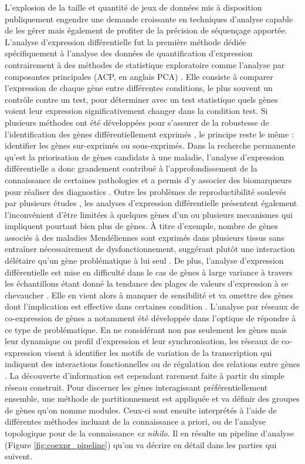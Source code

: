 L'explosion de la taille et quantité de jeux de données mis à disposition publiquement engendre une demande croissante en techniques d'analyse capable de les gérer mais également de profiter de la précision de séquençage apportée. L'analyse d'expression différentielle fut la première méthode dédiée spécifiquement à l'analyse des données de quantification d'expression contrairement à des méthodes de statistique exploratoire comme l'analyse par composantes principales (ACP, en anglais \acrshort{PCA}) \cite{deKok2005Jan}. Elle consiste à comparer l'expression de chaque gène entre différentes \glspl{condition}, le plus souvent un contrôle contre un test, pour déterminer avec un test statistique quels gènes voient leur expression significativement changer dans la condition test. Si plusieurs méthodes ont été développées pour s'assurer de la robustesse de l'identification des gènes différentiellement exprimés \cite{Soneson2013Dec,Spies2019Jan}, le principe reste le même : identifier les gènes sur-exprimés ou sous-exprimés. Dans la recherche permanente qu'est la priorisation de gènes candidats à une maladie, l'analyse d'expression différentielle a donc grandement contribué à l'approfondissement de la connaissance de certaines pathologies et a permis d'y associer des biomarqueurs pour réaliser des diagnostics \cite{Costa-Silva2017Dec}. Outre les problèmes de reproductibilité soulevés par plusieurs études \cite{Ostlund2014}, les analyses d'expression différentielle présentent 
également l'inconvénient d'être limitées à quelques gènes d'un ou plusieurs \glspl{mecanisme} qui impliquent pourtant bien plus de gènes. À titre d'exemple, nombre de gènes associés à des maladies Mendéliennes sont exprimés dans plusieurs tissus sans entraîner nécessairement de dysfonctionnement, suggérant plutôt une interaction délétaire qu'un gène problématique à lui seul \cite{Hekselman2020Mar}. De plus, l'analyse d'expression différentielle est mise en difficulté dans le cas de gènes à large variance à travers les échantillons étant donné la tendance des plages de valeurs d'expression à se chevaucher \cite{Ostlund2014}. Elle en vient alors à manquer de sensibilité et va omettre des gènes dont l'implication est effective dans certaines condition \cite{delaFuente2010Jul}. L'analyse par réseaux de co-expression de gènes a notamment été développée dans l'optique de répondre à ce type de problématique. En ne considérant non pas seulement les gènes mais leur dynamique ou profil d'expression et leur synchronisation, les réseaux de co-expression visent à identifier les motifs de variation de la transcription qui indiquent des interactions fonctionnelles ou de régulation des relations entre gènes \cite{Parsana2019}. La découverte d'information est cependant rarement faite à partir du simple réseau construit. Pour discerner les gènes interagissant préférentiellement ensemble, une méthode de partitionnement est appliquée et va définir des groupes de gènes qu'on nomme \glspl{module}. Ceux-ci sont ensuite interprétés à l'aide de différentes méthodes incluant de la connaissance a priori, ou de l'analyse topologique pour de la connaissance \textit{ex nihilo}. Il en résulte un pipeline d'analyse (Figure \ref{fig:coexpr_pipeline}) \cite{Zhang2005a} qu'on va décrire en détail dans les parties qui suivent.


